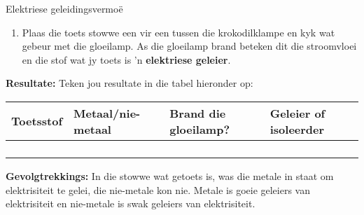 \begin{g_experiment}{Elektriese geleidingsvermo\"e}
{\begin{enumerate}[noitemsep, label=\textbf{\arabic*}. ]
\item Plaas die toets stowwe een vir een tussen die krokodilklampe en kyk wat gebeur met die gloeilamp. As die gloeilamp brand beteken dit die stroomvloei en die stof wat jy toets is 'n \textbf{elektriese geleier}.
\end{enumerate}
        \par 
      \label{m38706*id66291}\noindent{}\textbf{Resultate:}
        \newline
        Teken jou resultate in die tabel hieronder op:
          \begin{table}[H]
        \begin{center}
      \label{m38706*id66304}
    \noindent
      \begin{tabular}{|p{2cm}|p{2cm}|p{2cm}|p{2cm}|}\hline
                \textbf{Toetsstof}
               &
                \textbf{Metaal/nie-metaal}
               &
                \textbf{Brand die gloeilamp?}
               &
                \textbf{Geleier of isoleerder}
            \\ \hline
         &
         &
         &
       \\ \hline
         &
         &
         &
       \\ \hline
         &
         &
         &
        \\ \hline
         &
         &
         &
        \\ \hline
    \end{tabular}
      \end{center}
\end{table}
    \par
  \par 
      \label{m38706*id66494}\noindent{}\textbf{Gevolgtrekkings:}
        \newline
        In die stowwe wat getoets is, was die metale in staat om elektrisiteit te gelei, die nie-metale kon nie. Metale is goeie geleiers van elektrisiteit en nie-metale is swak geleiers van elektrisiteit. }
            \end{g_experiment}
    \label{m38706*cid7}
